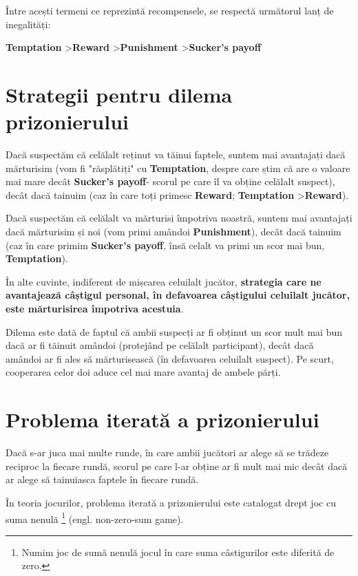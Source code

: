 Între acești termeni ce reprezintă recompensele, se respectă următorul lanț de inegalități: 

\begin{center} 
	\textbf{Temptation} \textgreater \textbf{Reward} \textgreater \textbf{Punishment} \textgreater \textbf{Sucker's payoff} 
\end{center} 

\section{Strategii pentru dilema prizonierului}

Dacă suspectăm că celălalt reținut va tăinui faptele, suntem mai avantajați dacă mărturisim (vom fi "răsplătiți" cu \textbf{Temptation}, despre care știm că are o valoare mai mare decât \textbf{Sucker's payoff}- scorul pe care îl va obține celălalt suspect), decât dacă tainuim (caz în care toți primesc \textbf{Reward}; \textbf{Temptation} \textgreater \textbf{Reward}).

Dacă suspectăm că celălalt va mărturisi împotriva noastră, suntem mai avantajați dacă mărturisim și noi (vom primi amândoi \textbf{Punishment}), decât dacă tainuim (caz în care primim \textbf{Sucker's payoff}, însă celalt va primi un scor mai bun, \textbf{Temptation}).

În alte cuvinte, indiferent de mișcarea celuilalt jucător, \textbf{strategia care ne avantajează câștigul personal, în defavoarea câștigului celuilalt jucător, este mărturisirea împotriva acestuia}.

Dilema este dată de faptul că ambii suspecți ar fi obținut un scor mult mai bun dacă ar fi tăinuit amândoi (protejând pe celălalt participant), decât dacă amândoi ar fi ales să mărturisească (în defavoarea celuilalt suspect). Pe scurt, cooperarea celor doi aduce cel mai mare avantaj de ambele părți.

\section {Problema iterată a prizonierului} 

Dacă s-ar juca mai multe runde, în care ambii jucători ar alege să se trădeze reciproc la fiecare rundă, scorul pe care l-ar obține ar fi mult mai mic decât dacă ar alege să tainuiasca faptele în fiecare rundă. 

În teoria jocurilor, problema iterată a prizonierului este catalogat drept joc cu suma nenulă \footnote{Numim joc de sumă nenulă jocul în care suma câstigurilor este diferită de zero.} (engl. non-zero-sum game).


